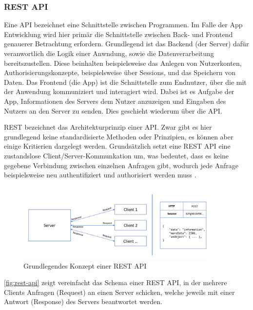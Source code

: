\subsubsection*{\ac{REST} \ac{API}}
Eine \ac{API} bezeichnet eine Schnittstelle zwischen Programmen. 
Im Falle der App Entwicklung wird hier primär die Schnittstelle zwischen Back- und Frontend genauerer Betrachtung erfordern.
Grundlegend ist das Backend (der Server) dafür veranwortlich die Logik einer Anwndung, sowie die Datenverarbeitung bereitszustellen.
Diese beinhalten beispielsweise das Anlegen von Nutzerkonten, Authorisierungskonzepte, beispielsweise über Sessions, und das Speichern von Daten.
Das Frontend (die App) ist die Schnittstelle zum Endnutzer, über die mit der Anwendung kommuniziert und interagiert wird.
Dabei ist es Aufgabe der App, Informationen des Servers dem Nutzer anzuzeigen und Eingaben des Nutzers an den Server zu senden. 
Dies geschieht wiederum über die \ac{API}.

\ac{REST} bezeichnet das Architekturprinzip einer API.
Zwar gibt es hier grundlegend keine standardisierte Methoden oder Prinzipien, es können aber einige Kritierien dargelegt werden.
Grundsätzlich setzt eine \ac{REST} \ac{API} eine zustandslose Client/Server-Kommunkation um, was bedeutet, dass es keine gegebene Verbindung zwischen einzelnen Anfragen gibt, wodurch jede Anfrage beispielsweise neu authentifiziert und authorisiert werden muss \autocite{B_RedHat.}.

\begin{figure}[h]
    \begin{center}
        \includegraphics[width=0.9\textwidth]{img/rest_api.PNG}
    \end{center}
    \caption{Grundlegendes Konzept einer REST API}
    \label{fig:rest-api}
\end{figure}

\autoref{fig:rest-api} zeigt vereinfacht das Schema einer \ac{REST} \ac{API}, in der mehrere Clients Anfragen (Request) an einen Server schicken, welche jeweils mit einer Antwort (Response) des Servers beantwortet werden.

